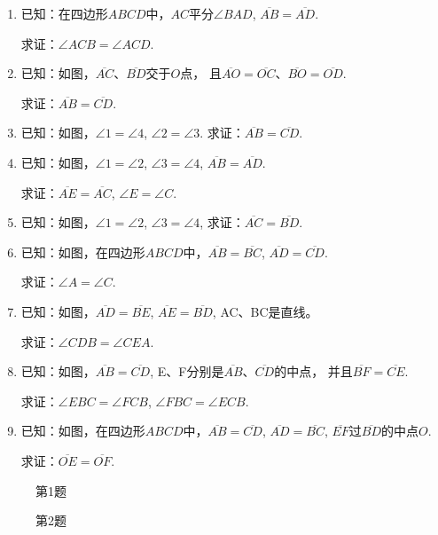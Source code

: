 \begin{ex}
\begin{enumerate}
    \item 已知：在四边形$ABCD$中，$AC$平分$\angle BAD$, $\overline{AB}=\overline{AD}$.
    
    求证：$\angle ACB=\angle ACD$.
    \item 已知：如图，$\overline{AC}$、$\overline{BD}$交于$O$点，    且$\overline{AO}=\overline{OC}$、$\overline{BO}=\overline{OD}$.
    
    求证：$\overline{AB}=\overline{CD}$.


\item 已知：如图，$\angle 1=\angle 4$, $\angle 2=\angle 3$.
求证：$\overline{AB}=\overline{CD}$.
\item 已知：如图，$\angle 1=\angle 2$, $\angle 3=\angle 4$, $\overline{AB}=\overline{AD}$. 

求证：$\overline{AE}=\overline{AC}$, $\angle E=\angle C$.

\item 已知：如图，$\angle 1=\angle 2$, $\angle 3=\angle 4$,
求证：$\overline{AC}=\overline{BD}$.
\item 已知：如图，在四边形$ABCD$中，$\overline{AB}=\overline{BC}$, $\overline{AD}=\overline{CD}$.

求证：$\angle A=\angle C$.
\item 已知：如图，$\overline{AD}=\overline{BE}$, $\overline{AE}=\overline{BD}$, AC、BC是直线。

求证：$\angle CDB=\angle CEA$.
\item 已知：如图，$\overline{AB}=\overline{CD}$, E、F分别是$\overline{AB}$、$\overline{CD}$的中点，
并且$\overline{BF}=\overline{CE}$.

求证：$\angle EBC=\angle FCB$, $\angle FBC=\angle ECB$.

\item 已知：如图，在四边形$ABCD$中，$\overline{AB}=\overline{CD}$, $\overline{AD}=\overline{BC}$, $\overline{EF}$过$\overline{BD}$的中点$O$. 

求证：$\overline{OE}=\overline{OF}$.
\end{enumerate}
\end{ex}

\begin{figure}[htp]\centering
    \begin{minipage}[t]{0.48\textwidth}
    \centering
{}
    \caption*{第1题}
    \end{minipage}
    \begin{minipage}[t]{0.48\textwidth}
    \centering
    \caption*{第2题}
    \end{minipage}
    \end{figure}

